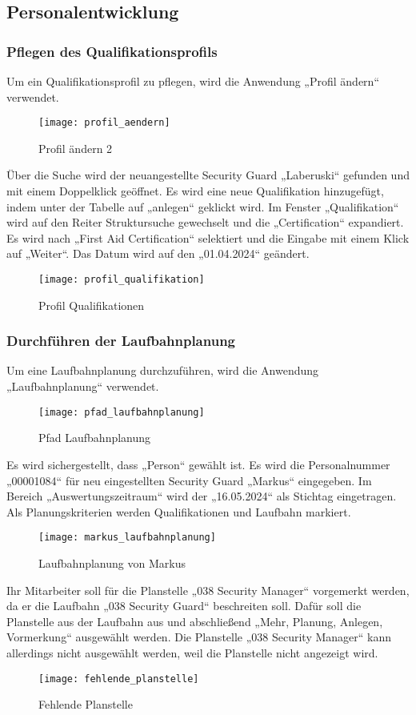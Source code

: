 \subsection{Personalentwicklung}

\subsubsection{Pflegen des Qualifikationsprofils}
Um ein Qualifikationsprofil zu pflegen, wird die Anwendung „Profil ändern“ verwendet.
\begin{figure}[H]
	\centering
	\texttt{[image: profil\_aendern]}
	\caption{Profil ändern 2}
	\label{fig:profil_aendern}
\end{figure}
Über die Suche wird der neuangestellte Security Guard „Laberuski“ gefunden und mit einem Doppelklick geöffnet. Es wird eine neue Qualifikation hinzugefügt, indem unter der Tabelle auf „anlegen“ geklickt wird. Im Fenster „Qualifikation“ wird auf den Reiter Struktursuche gewechselt und die „Certification“ expandiert. Es wird nach „First Aid Certification“ selektiert und die Eingabe mit einem Klick auf „Weiter“. Das Datum wird auf den „01.04.2024“ geändert.
\begin{figure}[H]
	\centering
	\texttt{[image: profil\_qualifikation]}
	\caption{Profil Qualifikationen}
	\label{fig:profil_qualifikation}
\end{figure}

\subsubsection{Durchführen der Laufbahnplanung}
Um eine Laufbahnplanung durchzuführen, wird die Anwendung „Laufbahnplanung“ verwendet.
\begin{figure}[H]
	\centering
	\texttt{[image: pfad\_laufbahnplanung]}
	\caption{Pfad Laufbahnplanung}
	\label{fig:pfad_laufbahnplanung}
\end{figure}
Es wird sichergestellt, dass „Person“ gewählt ist. Es wird die Personalnummer „00001084“ für neu eingestellten Security Guard „Markus“ eingegeben. Im Bereich „Auswertungszeitraum“ wird der „16.05.2024“ als Stichtag eingetragen. Als Planungskriterien werden Qualifikationen und Laufbahn markiert.
\begin{figure}[H]
	\centering
	\texttt{[image: markus\_laufbahnplanung]}
	\caption{Laufbahnplanung von Markus}
	\label{fig:markus_laufbahnplanung}
\end{figure}
Ihr Mitarbeiter soll für die Planstelle „038 Security Manager“ vorgemerkt werden, da er die Laufbahn „038 Security Guard“ beschreiten soll. Dafür soll die Planstelle aus der Laufbahn aus und abschließend „Mehr, Planung, Anlegen, Vormerkung“ ausgewählt werden. Die Planstelle „038 Security Manager“ kann allerdings nicht ausgewählt werden, weil die Planstelle nicht angezeigt wird. 
\begin{figure}[H]
	\centering
	\texttt{[image: fehlende\_planstelle]}
	\caption{Fehlende Planstelle}
	\label{fig:fehlende_planstelle}
\end{figure}

